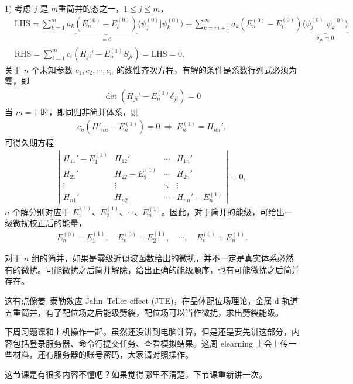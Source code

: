 1) 考虑 $j$ 是 $m$重简并的态之一，$1 \leqslant j \leqslant m$，
\begin{align}
    &\text{LHS} = 
    \sum_{k=1}^m a_k 
    \underbrace{(E_n^{(0)} - E_l^{(0)})}_{=0}
    \langle \psi_j^{(0)} | \psi_k^{(0)} \rangle
    +
    \sum_{k=m+1}^\infty a_k 
    (E_n^{(0)} - E_l^{(0)})
    \underbrace{\langle \psi_j^{(0)} | \psi_k^{(0)} \rangle}_{\delta_{jk}=0}
    \\
    &\text{RHS} = \sum_{i=1}^{m} c_i (H_{ji}' - E_n^{(1)}S_{ji}) = \text{LHS} = 0,
\end{align}
关于 $n$ 个未知参数 $c_1, c_2, \cdots, c_n$ 的线性齐次方程，有解的条件是系数行列式必须为零，即
\begin{align}
    \det\left(H_{ji}' - E_n^{(1)} \delta_{ji}\right) = 0
\end{align}
当 $m = 1$ 时，即同归非简并体系，则
\begin{align}
    c_n (H'_{nn} - E_n^{(1)}) = 0 \ \Rightarrow \ E_n^{(1)} = H_{nn}', 
\end{align}
可得久期方程
\begin{align}
    \left|\begin{matrix}
        H_{11}' - E_1^{(1)} & H_{12}' & \cdots & H_{1n}' \\
        H_{21}' & H_{22} - E_2^{(1)} & \cdots & H_{2n}' \\
        \vdots & \vdots & \ddots & \vdots \\
        H_{n1}' & H_{n2} & \cdots & H_{nn}' - E_n^{(1)}
    \end{matrix}
    \right|=0,
\end{align}
$n$ 个解分别对应于 $E_1^{(1)}$、$E_2^{(1)}$、$\cdots$、$E_n^{(1)}$。因此，对于简并的能级，可给出一级微扰校正后的能量，
\begin{align}
    E_n^{(0)}+E_1^{(1)}, \quad E_n^{(0)}+E_2^{(1)}, \quad\cdots,\quad E_n^{(0)}+E_n^{(1)}. 
\end{align}

对于 $n$ 组的简并，如果是零级近似波函数给出的微扰，并不一定是真实体系必然有的微扰。可能微扰之后简并解除，给出正确的能级顺序，也有可能微扰之后简并存在。

这有点像姜--泰勒效应 Jahn--Teller effect (JTE)，在晶体配位场理论，金属 d 轨道五重简并，有了配位场之后能级劈裂，配位场可以当作微扰，求出劈裂能级。

下周习题课和上机操作一起。虽然还没讲到电脑计算，但是还是要先讲这部分，内容包括登录服务器、命令行提交任务、查看模拟结果。这周 elearning 上会上传一些材料，还有服务器的账号密码，大家请对照操作。

这节课是有很多内容不懂吧？如果觉得哪里不清楚，下节课重新讲一次。
